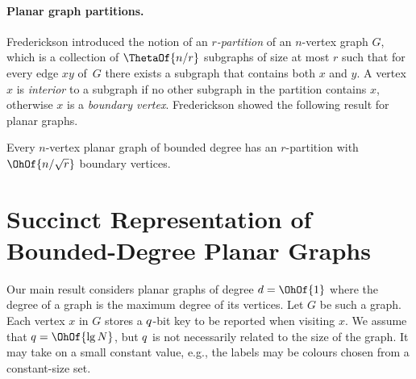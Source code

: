 {%
\paragraph{Planar graph partitions.}

Frederickson \cite{Frederickson87} introduced the notion of an
\emph{$r$-partition} of an $n$-vertex graph $G$, which is a collection of
$\ThetaOf{n / r}$ subgraphs of size at most $r$ such that for every
edge $xy$ of~$G$ there exists a subgraph that contains both $x$ and $y$.
A vertex $x$ is \emph{interior} to a subgraph if no other
subgraph in the partition contains $x$, otherwise $x$ is a
\emph{boundary vertex}.
Frederickson showed the following result for planar graphs.

\begin{lemma}
  \label{lem:fred_graph_sep}
  Every $n$-vertex planar graph of bounded degree has an $r$-partition
  with $\OhOf{n / \sqrt{r}}$ boundary vertices.
\end{lemma}




\section{Succinct Representation of Bounded-Degree Planar Graphs}
\label{sec:graph_rep}


Our main result considers planar graphs of degree $d = \OhOf{1}$
where the degree of a graph is the maximum degree of its vertices.
Let $G$ be such a graph.
Each vertex $x$ in $G$ stores a $q$-bit key
to be reported when visiting $x$.
We assume that $\bitsPerKey = \OhOf{\lg N}$, but
$q$ is not necessarily related to the size of the graph.
It may take on a small constant value, e.g., the labels may be colours
chosen from a constant-size set.

}
